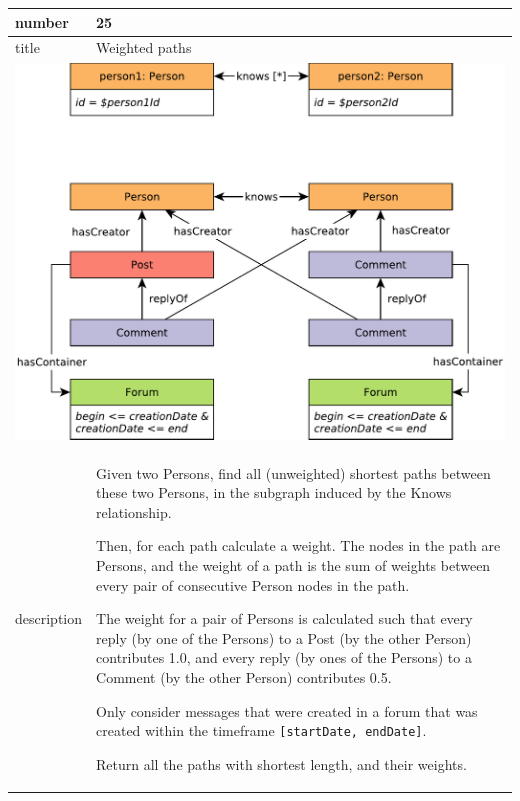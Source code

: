 \renewcommand*{\arraystretch}{1.1}

\noindent\begin{tabularx}{17cm}{|p{1.95cm}|X|}
	\hline
	number      & 25                                                          \\ \hline
%
	title       & Weighted paths                                                           \\ \hline
	\multicolumn{2}{|c|}{ \includegraphics[scale=\patternscale,margin=0cm .2cm]{patterns/q25}} \\ \hline
	description & Given two Persons, find all (unweighted) shortest paths between these
two Persons, in the subgraph induced by the Knows relationship.

Then, for each path calculate a weight. The nodes in the path are
Persons, and the weight of a path is the sum of weights between every
pair of consecutive Person nodes in the path.

The weight for a pair of Persons is calculated such that every reply (by
one of the Persons) to a Post (by the other Person) contributes 1.0, and
every reply (by ones of the Persons) to a Comment (by the other Person)
contributes 0.5.

Only consider messages that were created in a forum that was created
within the timeframe \texttt{{[}startDate,\ endDate{]}}.

Return all the paths with shortest length, and their weights.
 \\ \hline
	

\end{tabularx}
